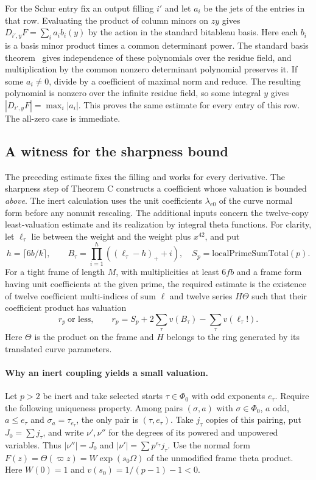 For the Schur entry fix an output filling $i'$ and let $a_i$ be the jets of the entries in that row. Evaluating the product of column minors on $zy$ gives
$D_{i',y}F=\sum_i a_i b_i(y)$ by the action in the standard bitableau basis. Here each $b_i$ is a basis minor product times a common determinant power. The standard basis theorem~\cite[Proposition~4.1 and Theorem~4.11]{brunsvetter} gives independence of these polynomials over the residue field, and multiplication by the common nonzero determinant polynomial preserves it. If some $a_i\ne0$, divide by a coefficient of maximal norm and reduce. The resulting polynomial is nonzero over the infinite residue field, so some integral $y$ gives $|D_{i',y}F|=\max_i|a_i|$. This proves the same estimate for every entry of this row. The all-zero case is immediate.

\subsection{A witness for the sharpness bound}\label{jets:sharp}
The preceding estimate fixes the filling and works for every derivative. The sharpness step of Theorem C constructs a coefficient whose valuation is bounded \emph{above}. The inert calculation uses the unit coefficients $\lambda_{e0}$ of the curve normal form before any nonunit rescaling. The additional inputs concern the twelve-copy least-valuation estimate and its realization by integral theta functions. For clarity, let $\ell_\tau$ lie between the weight and the weight plus $x^{42}$, and put
\[
 h=\lceil6b/k\rceil,\qquad B_\tau=\prod_{i=1}^h ((\ell_\tau-h)_++i),
 \quad S_p=\mathrm{localPrimeSumTotal}(p).
\]
For a tight frame of length $M$, with multiplicities at least $6fb$ and a frame form having unit coefficients at the given prime, the required estimate is the existence of twelve coefficient multi-indices of sum $\ell$ and twelve series $H\Theta$ such that their coefficient product has valuation
\[
 r_p\ \text{or less},\qquad
 r_p=S_p+2\sum_\tau v(B_\tau)-\sum_\tau v(\ell_\tau!).
\]
Here $\Theta$ is the product on the frame and $H$ belongs to the ring generated by its translated curve parameters.
\paragraph{Why an inert coupling yields a small valuation.}
Let $p>2$ be inert and take selected starts $\tau\in\Phi_0$ with odd exponents $e_\tau$.
Require the following uniqueness property. Among pairs $(\sigma,a)$ with
$\sigma\in\Phi_0$, $a$ odd, $a\le e_\tau$ and $\sigma_a=\tau_{e_\tau}$, the only pair is $(\tau,e_\tau)$. Take $j_\tau$ copies of this pairing,
put $J_0=\sum j_\tau$, and write $\nu',\nu''$ for the degrees of its powered and unpowered variables. Thus $|\nu''|=J_0$ and $|\nu'|=\sum p^{e_\tau}j_\tau$.
Use the normal form $F(z)=\Theta(\varpi z)=W\exp(s_0\Omega)$ of the unmodified frame theta product. Here $W(0)=1$ and $v(s_0)=1/(p-1)-1<0$.

